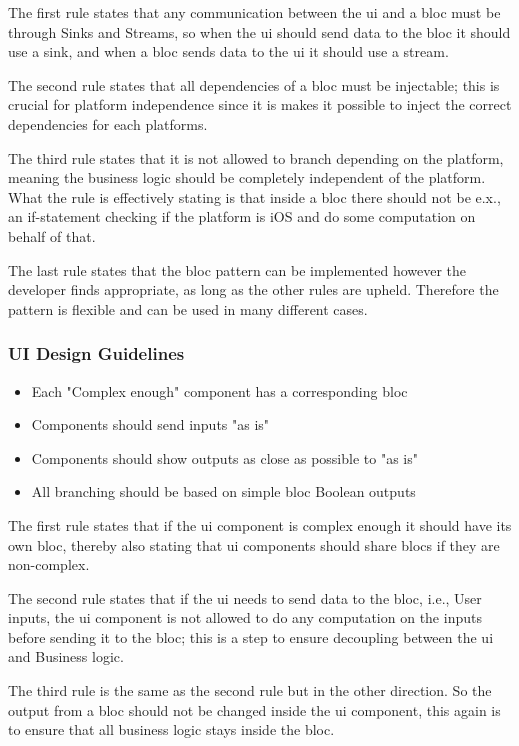 The first rule states that any communication between the \gls{ui} and a \gls{bloc} must be through Sinks and Streams, so when the \gls{ui} should send data to the \gls{bloc} it should use a sink, and when a \gls{bloc} sends data to the \gls{ui} it should use a stream.

The second rule states that all dependencies of a \gls{bloc} must be injectable; this is crucial for platform independence since it is makes it possible to inject the correct dependencies for each platforms.


The third rule states that it is not allowed to branch depending on the platform, meaning the business logic should be completely independent of the platform. What the rule is effectively stating is that inside a \gls{bloc} there should not be e.x., an if-statement checking if the platform is iOS and do some computation on behalf of that.

The last rule states that the \gls{bloc} pattern can be implemented however the developer finds appropriate, as long as the other rules are upheld. Therefore the pattern is flexible and can be used in many different cases.

\subsubsection{UI Design Guidelines} \label{subsubsec: UI_design_guidelines}
\begin{itemize}
  \item Each "Complex enough" component has a corresponding \gls{bloc}
  \item Components should send inputs "as is"
  \item Components should show outputs as close as possible to "as is"
  \item All branching should be based on simple \gls{bloc} Boolean outputs
\end{itemize}

The first rule states that if the \gls{ui} component is complex enough it should have its own \gls{bloc}, thereby also stating that \gls{ui} components should share \glspl{bloc} if they are non-complex.

The second rule states that if the \gls{ui} needs to send data to the \gls{bloc}, i.e., User inputs, the \gls{ui} component is not allowed to do any computation on the inputs before sending it to the \gls{bloc}; this is a step to ensure decoupling between the \gls{ui} and Business logic.

The third rule is the same as the second rule but in the other direction. So the output from a \gls{bloc} should not be changed inside the \gls{ui} component, this again is to ensure that all business logic stays inside the \gls{bloc}.

